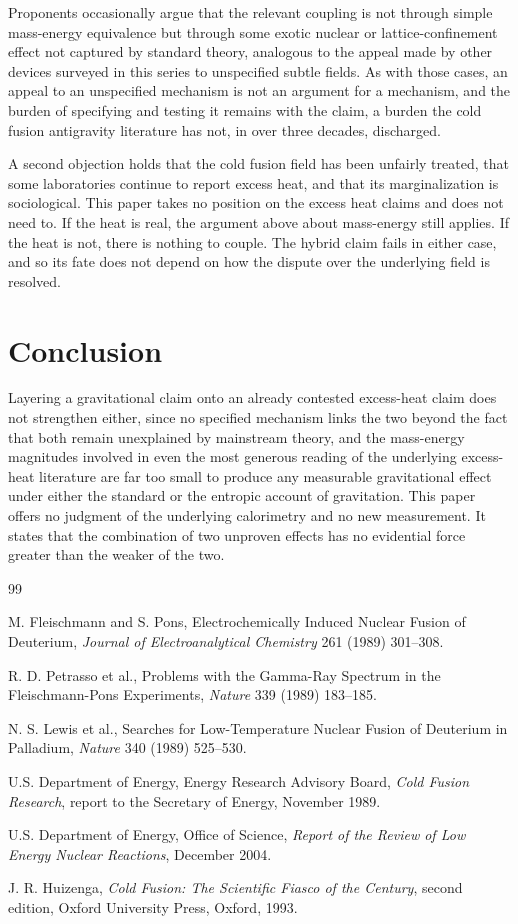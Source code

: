 \documentclass[11pt]{article}
\begin{document}
Proponents occasionally argue that the relevant coupling is not through simple mass-energy equivalence but through some exotic nuclear or lattice-confinement effect not captured by standard theory, analogous to the appeal made by other devices surveyed in this series to unspecified subtle fields. As with those cases, an appeal to an unspecified mechanism is not an argument for a mechanism, and the burden of specifying and testing it remains with the claim, a burden the cold fusion antigravity literature has not, in over three decades, discharged.

A second objection holds that the cold fusion field has been unfairly treated, that some laboratories continue to report excess heat, and that its marginalization is sociological. This paper takes no position on the excess heat claims and does not need to. If the heat is real, the argument above about mass-energy still applies. If the heat is not, there is nothing to couple. The hybrid claim fails in either case, and so its fate does not depend on how the dispute over the underlying field is resolved.

\section{Conclusion}

Layering a gravitational claim onto an already contested excess-heat claim does not strengthen either, since no specified mechanism links the two beyond the fact that both remain unexplained by mainstream theory, and the mass-energy magnitudes involved in even the most generous reading of the underlying excess-heat literature are far too small to produce any measurable gravitational effect under either the standard or the entropic account of gravitation. This paper offers no judgment of the underlying calorimetry and no new measurement. It states that the combination of two unproven effects has no evidential force greater than the weaker of the two.

\begin{thebibliography}{99}

 M. Fleischmann and S. Pons, Electrochemically Induced Nuclear Fusion of Deuterium, \emph{Journal of Electroanalytical Chemistry} 261 (1989) 301--308.

 R. D. Petrasso et al., Problems with the Gamma-Ray Spectrum in the Fleischmann-Pons Experiments, \emph{Nature} 339 (1989) 183--185.

 N. S. Lewis et al., Searches for Low-Temperature Nuclear Fusion of Deuterium in Palladium, \emph{Nature} 340 (1989) 525--530.

 U.S. Department of Energy, Energy Research Advisory Board, \emph{Cold Fusion Research}, report to the Secretary of Energy, November 1989.

 U.S. Department of Energy, Office of Science, \emph{Report of the Review of Low Energy Nuclear Reactions}, December 2004.

 J. R. Huizenga, \emph{Cold Fusion: The Scientific Fiasco of the Century}, second edition, Oxford University Press, Oxford, 1993.

\end{thebibliography}
\end{document}
